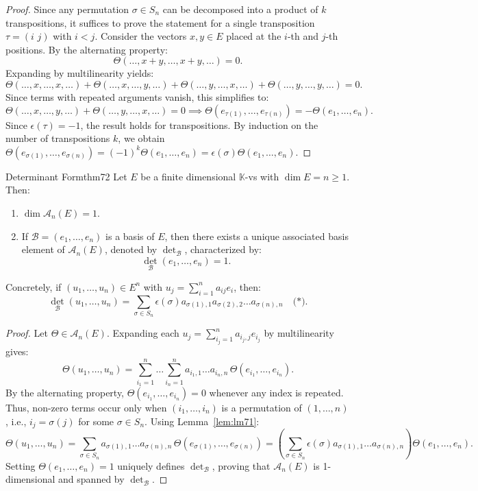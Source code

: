 \documentclass[11pt, a4paper]{article}
\newcommand{\K}{\mathbb{K}}
\begin{document}
\begin{proof}
  Since any permutation $\sigma \in S_n$ can be decomposed into a product of $k$ transpositions, it suffices to prove the statement for a single transposition $\tau = (i \,\, j)$ with $i < j$.
  Consider the vectors $x, y \in E$ placed at the $i$-th and $j$-th positions. By the alternating property:
  \[
    \Theta(\dots, x+y, \dots, x+y, \dots) = 0.
  \]
  Expanding by multilinearity yields:
  \[
    \Theta(\dots, x, \dots, x, \dots) + \Theta(\dots, x, \dots, y, \dots) + \Theta(\dots, y, \dots, x, \dots) + \Theta(\dots, y, \dots, y, \dots) = 0.
  \]
  Since terms with repeated arguments vanish, this simplifies to:
  \[
    \Theta(\dots, x, \dots, y, \dots) + \Theta(\dots, y, \dots, x, \dots) = 0 \implies \Theta(e_{\tau(1)}, \dots, e_{\tau(n)}) = -\Theta(e_1, \dots, e_n).
  \]
  Since $\epsilon(\tau) = -1$, the result holds for transpositions. By induction on the number of transpositions $k$, we obtain $\Theta(e_{\sigma(1)}, \dots, e_{\sigma(n)}) = (-1)^k \Theta(e_1, \dots, e_n) = \epsilon(\sigma) \Theta(e_1, \dots, e_n)$.
\end{proof}

\begin{theorem}{Determinant Form}{thm72}
  Let $E$ be a finite dimensional $\K$-vs with $\dim E = n \ge 1$. Then:
  \begin{enumerate}
    \item $\dim \mathcal{A}_n(E) = 1$.
    \item If $\mathcal{B} = (e_1, \dots, e_n)$ is a basis of $E$, then there exists a unique associated basis element of $\mathcal{A}_n(E)$, denoted by $\det_{\mathcal{B}}$, characterized by:
    \[
      \det_{\mathcal{B}}(e_1, \dots, e_n) = 1.
    \]
  \end{enumerate}
  Concretely, if $(u_1, \dots, u_n) \in E^n$ with $u_j = \sum_{i=1}^n a_{ij} e_i$, then:
  \[
    \det_{\mathcal{B}}(u_1, \dots, u_n) = \sum_{\sigma \in S_n} \epsilon(\sigma) a_{\sigma(1), 1} a_{\sigma(2), 2} \dots a_{\sigma(n), n} \quad \text{(*)}.
  \]
\end{theorem}

\begin{proof}
  Let $\Theta \in \mathcal{A}_n(E)$. Expanding each $u_j = \sum_{i_j=1}^n a_{i_j, j} e_{i_j}$ by multilinearity gives:
  \[
    \Theta(u_1, \dots, u_n) = \sum_{i_1=1}^n \dots \sum_{i_n=1}^n a_{i_1, 1} \dots a_{i_n, n} \, \Theta(e_{i_1}, \dots, e_{i_n}).
  \]
  By the alternating property, $\Theta(e_{i_1}, \dots, e_{i_n}) = 0$ whenever any index is repeated. Thus, non-zero terms occur only when $(i_1, \dots, i_n)$ is a permutation of $(1, \dots, n)$, i.e., $i_j = \sigma(j)$ for some $\sigma \in S_n$. 
  Using Lemma~\ref{lem:lm71}:
  \[
    \Theta(u_1, \dots, u_n) = \sum_{\sigma \in S_n} a_{\sigma(1), 1} \dots a_{\sigma(n), n} \, \Theta(e_{\sigma(1)}, \dots, e_{\sigma(n)}) = \left( \sum_{\sigma \in S_n} \epsilon(\sigma) a_{\sigma(1), 1} \dots a_{\sigma(n), n} \right) \Theta(e_1, \dots, e_n).
  \]
  Setting $\Theta(e_1, \dots, e_n) = 1$ uniquely defines $\det_{\mathcal{B}}$, proving that $\mathcal{A}_n(E)$ is 1-dimensional and spanned by $\det_{\mathcal{B}}$.
\end{proof}
\end{document}
